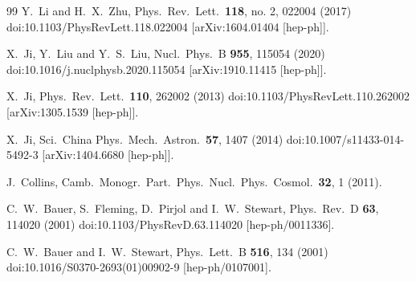 \begin{thebibliography}{99}
  Y.~Li and H.~X.~Zhu,
  Phys.\ Rev.\ Lett.\  {\bf 118}, no. 2, 022004 (2017)
  doi:10.1103/PhysRevLett.118.022004
  [arXiv:1604.01404 [hep-ph]].


  X.~Ji, Y.~Liu and Y.~S.~Liu,
  Nucl.\ Phys.\ B {\bf 955}, 115054 (2020)
  doi:10.1016/j.nuclphysb.2020.115054
  [arXiv:1910.11415 [hep-ph]].


  X.~Ji,
  Phys.\ Rev.\ Lett.\  {\bf 110}, 262002 (2013)
  doi:10.1103/PhysRevLett.110.262002
  [arXiv:1305.1539 [hep-ph]].


  X.~Ji,
  Sci.\ China Phys.\ Mech.\ Astron.\  {\bf 57}, 1407 (2014)
  doi:10.1007/s11433-014-5492-3
  [arXiv:1404.6680 [hep-ph]].


  J.~Collins,
  Camb.\ Monogr.\ Part.\ Phys.\ Nucl.\ Phys.\ Cosmol.\  {\bf 32}, 1 (2011).


  C.~W.~Bauer, S.~Fleming, D.~Pirjol and I.~W.~Stewart,
  Phys.\ Rev.\ D {\bf 63}, 114020 (2001)
  doi:10.1103/PhysRevD.63.114020
  [hep-ph/0011336].


  C.~W.~Bauer and I.~W.~Stewart,
  Phys.\ Lett.\ B {\bf 516}, 134 (2001)
  doi:10.1016/S0370-2693(01)00902-9
  [hep-ph/0107001].



\end{thebibliography}
